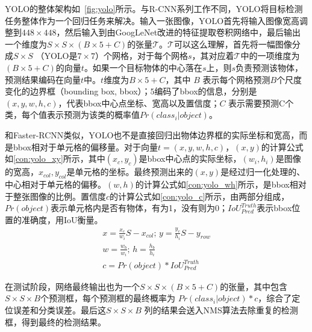 

YOLO的整体架构如\figurename \, \ref{fig:yolo}所示。与R-CNN系列工作不同，YOLO将目标检测任务整体作为一个回归任务来解决。输入一张图像，YOLO首先将输入图像宽高调整到$448 \times 448$，然后输入到由GoogLeNet\cite{7298594,7780677}改进的特征提取卷积网络中，最后输出一个维度为$S \times S \times (B \times 5 + C)$的张量$\mathcal{T}$。$\mathcal{T}$可以这么理解，首先将一幅图像分成$S \times S$ （YOLO是$7\times 7$）个网格，对于每个网格$s$，其对应着$\mathcal{T}$中的一项维度为$(B \times 5 + C)$的向量$t$。如果一个目标物体的中心落在$s$上，则$s$负责预测该物体，预测结果编码在向量$t$中。$t$维度为$B \times 5 + C$，其中 $B$ 表示每个网格预测$B$个尺度变化的边界框（bounding box, bbox）；$5$编码了bbox的信息，分别是$(x,y,w,h,c)$，代表bbox中心点坐标、宽高以及置信度；$C$ 表示需要预测C个类，每个值表示预测为该类的概率值$Pr(class_i|object)$。

和Faster-RCNN类似，YOLO也不是直接回归出物体边界框的实际坐标和宽高，而是bbox相对于单元格的偏移量。对于向量$t=(x,y,w,h,c)$，$(x,y)$的计算公式如\ref{con:yolo_xy}所示，其中$(x_c,y_c)$是bbox中心点的实际坐标，$(w_i, h_i)$是图像的宽高，$x_{col}, y_{col}$是单元格的坐标。最终预测出来的$(x,y)$是经过归一化处理的、中心相对于单元格的偏移。$(w,h)$的计算公式如\ref{con:yolo_wh}所示，是bbox相对于整张图像的比例。置信度$c$的计算公式如\ref{con:yolo_c}所示，由两部分组成，$Pr(object)$表示单元格内是否有物体，有为1，没有则为0；$IoU^{Truth}_{Pred}$表示bbox位置的准确度，用IoU衡量。
\begin{gather}
x = \frac{x_c}{w_i}S - x_{col}; \, y = \frac{y_c}{h_i}S - y_{row} 
\label{con:yolo_xy}\\
w = \frac{w_b}{w_i}; \, h = \frac{h_b}{h_i}
\label{con:yolo_wh}\\
c = Pr(object)*IoU^{Truth}_{Pred}
\label{con:yolo_c}
\end{gather}

在测试阶段，网络最终输出也为一个$S \times S \times (B \times 5 + C)$的张量，其中包含$S \times S \times B$个预测框，每个预测框的最终概率为 $Pr(class_i|object)* c$，综合了定位误差和分类误差。最后这$S \times S \times B $ 列的结果会送入NMS算法去除重复的检测框，得到最终的检测结果。

